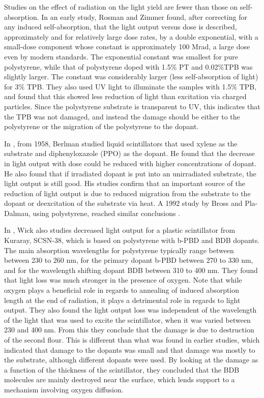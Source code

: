 Studies on the effect of radiation on the light yield are fewer
than those on self-absorption.
In an early study, Rosman and Zimmer found, after correcting
for any induced self-absorption, that the light
output versus dose is described,
approximately and for relatively large dose rates, by a double exponential, 
with a small-dose component whose constant is approximately 100 Mrad,
a large dose even by modern standards.
The exponential constant was smallest for pure polystyrene, while
that of polystyrene doped with 1.5\% PT  and 0.02\%TPB
was slightly larger.  The constant was considerably larger (less
self-absorption of light) for 3\% TPB.  They also used UV light to illuminate
the samples with 1.5\% TPB, and found that this showed less
reduction of light than excitation via charged particles.
Since the polystyrene substrate is transparent to UV, this
indicates that the TPB was not damaged, and instead the damage
should be either to the polystyrene or the migration of the polystyrene
to the dopant.

In \cite{berlman}, from 1958, Berlman studied liquid scintillators
that used xylene as the substrate and diphenyloxazole (PPO) as the dopant.
He found that the decrease in light output with dose could be
reduced with higher concentrations of dopant.  He also found
that if irradiated dopant is put into an unirradiated substrate,
the light output is still good.  His studies
confirm that
an important source of the reduction of light output is due to
reduced migration from the substrate 
to the dopant or deexcitation of the substrate via heat.
A 1992 study by Bross and Pla-Dalmau, using polystyrene,
reached similar conclusions \cite{173178}.

In \cite{Wick1991472}, Wick also studies decreased light
output for a plastic scintillator from Kuraray, SCSN-38, which
is based on polystyrene with b-PBD and BDB dopants.
The main absorption wavelengths for polystyrene typically range between
between 230 to 260 nm, for the primary dopant b-PBD between 270 to 330 nm,
and for the wavelength shifting dopant BDB between 310 to 400 nm.
They found that light loss was much stronger in the presence of oxygen.
Note that while oxygen plays a beneficial role in regards
to annealing of induced absorption length at the end of radiation, 
it plays a detrimental role in 
regards to light output.  
They also found the light output loss
was independent of the wavelength of the light
that was used to excite the scintillator, when it
was varied between 230 and 400 nm.
From this they conclude that the damage is due to destruction
of the second flour.  This is different than what was found in
earlier studies, which indicated that damage to the dopants was
small and that damage was mostly to the substrate,
although different dopants were used.
By looking at the damage as a function of the thickness of the scintillator,
they concluded that the BDB molecules are mainly destroyed
near the surface, which lends support to a mechanism involving
oxygen diffusion.

